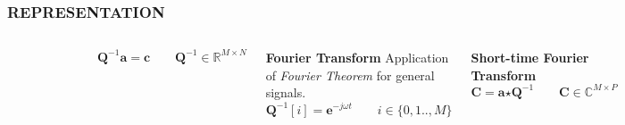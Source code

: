 \documentclass{beamer}
\begin{document}
\begin{frame}[noframenumbering]
\frametitle{REPRESENTATION}
\begin{columns}[c]
\begin{figure}
\includegraphics[width=\textwidth]{rep_1}
\end{figure}
\[
\textbf{Q}^{-1}\textbf{a} = \textbf{c} \qquad \textbf{Q}^{-1} \in \mathbb{R}^{M \times N}
\]
\begin{block}{\textbf{Fourier Transform}}
Application of \textit{Fourier Theorem} for general signals.
\[
\textbf{Q}^{-1}[i] = \textbf{e}^{-j \omega t} \qquad i \in \{0,1..,M\}
\]
\end{block}
\pause
\begin{block}{\textbf{Short-time Fourier Transform}}
\[
\textbf{C} = \textbf{a} \bm{\star} \textbf{Q}^{-1} \qquad \textbf{C} \in \mathbb{C}^{M \times P}
\]
\end{block}
\end{columns}
\end{frame}
\end{document}
